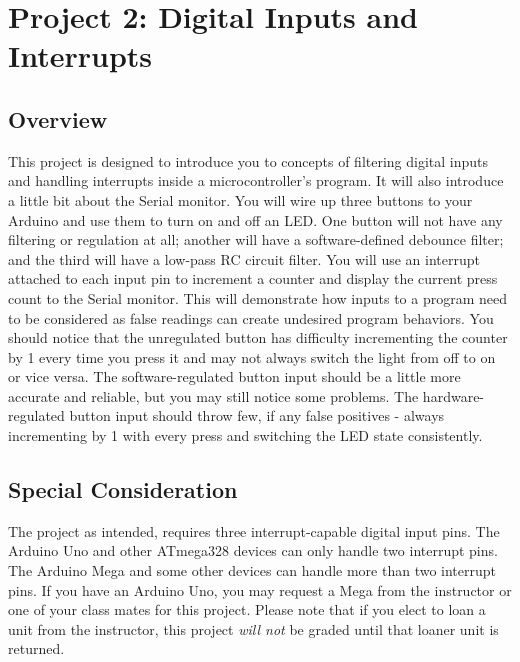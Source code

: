 %

\chapter{Project 2: Digital Inputs and Interrupts}

\section*{Overview}
This project is designed to introduce you to concepts of filtering digital inputs and handling interrupts inside a microcontroller's program. It will also introduce a little bit about the Serial monitor.
You will wire up three buttons to your Arduino and use them to turn on and off an LED.
One button will not have any filtering or regulation at all; another will have a software-defined debounce filter; and the third will have a low-pass RC circuit filter.
You will use an interrupt attached to each input pin to increment a counter and display the current press count to the Serial monitor.
This will demonstrate how inputs to a program need to be considered as false readings can create undesired program behaviors. 
You should notice that the unregulated button has difficulty incrementing the counter by 1 every time you press it and may not always switch the light from off to on or vice versa.
The software-regulated button input should be a little more accurate and reliable, but you may still notice some problems.
The hardware-regulated button input should throw few, if any false positives - always incrementing by 1 with every press and switching the LED state consistently.

\section*{Special Consideration}
The project as intended, requires three interrupt-capable digital input pins. 
The Arduino Uno and other ATmega328 devices can only handle two interrupt pins.
The Arduino Mega and some other devices can handle more than two interrupt pins.
If you have an Arduino Uno, you may request a Mega from the instructor or one of your class mates for this project.
Please note that if you elect to loan a unit from the instructor, this project \emph{will not} be graded until that loaner unit is returned.

